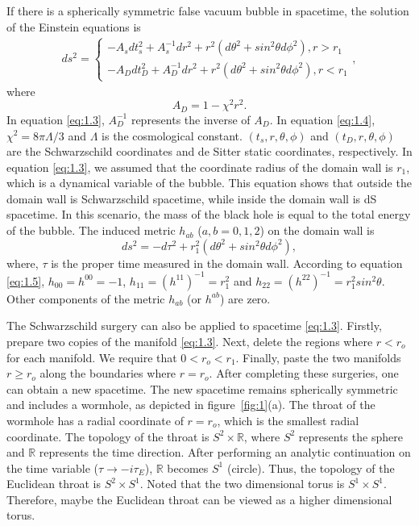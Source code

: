 \documentclass[12pt]{article}
\begin{document}
If there is a spherically symmetric false vacuum bubble in spacetime, the solution of the Einstein equations is~\cite{SEA}
\begin{eqnarray}
\label{eq:1.3}%
  ds^{2}=\begin{cases}
      -A_{s}dt_{s}^{2}+A_{s}^{-1}dr^{2}+r^{2}(d\theta^{2}+sin^{2} \theta d\phi^{2}),r>r_{1}\\
     -A_{D}dt_{D}^{2}+A_{D}^{-1}dr^{2}+r^{2}(d\theta^{2}+sin^{2} \theta d\phi^{2}),r<r_{1}
   \end{cases},
\end{eqnarray}
where
\begin{equation}
\label{eq:1.4}%
A_{D}=1-\chi^{2}r^{2}.
\end{equation}
In equation \eqref{eq:1.3}, $A_{D}^{-1}$ represents the inverse of $A_{D}$. In equation \eqref{eq:1.4}, $\chi^{2}=8\pi\Lambda/3$ and $\Lambda$ is the cosmological constant. $(t_{s}, r, \theta, \phi)$ and $(t_{D}, r, \theta, \phi)$ are the Schwarzschild coordinates and de Sitter static coordinates, respectively. In equation \eqref{eq:1.3}, we assumed that the coordinate radius of the domain wall is $r_{1}$, which is a dynamical variable of the bubble. This equation shows that outside the domain wall is Schwarzschild spacetime, while inside the domain wall is dS spacetime. In this scenario, the mass of the black hole is equal to the total energy of the bubble. The induced metric $h_{ab}$ ($a, b=0, 1, 2$) on the domain wall is~\cite{RJ}
\begin{equation}
\label{eq:1.5}%
ds^{2}=-d\tau^{2}+r_{1}^{2}(d\theta^{2}+sin^{2} \theta d\phi^{2}),
\end{equation}
where, $\tau$ is the proper time measured in the domain wall. According to equation \eqref{eq:1.5}, $h_{00}=h^{00}=-1$, $h_{11}=(h^{11})^{-1}=r_{1}^{2}$ and $h_{22}=(h^{22})^{-1}=r_{1}^{2}sin^{2}\theta$. Other components of the metric $h_{ab}$ (or $h^{ab}$) are zero.


The Schwarzschild surgery can also be applied to spacetime \eqref{eq:1.3}. Firstly, prepare two copies of the manifold \eqref{eq:1.3}. Next, delete the regions where $r<r_{o}$ for each manifold. We require that $0<r_{o}<r_{1}$. Finally, paste the two manifolds $r\geq r_{o}$ along the boundaries where $r=r_{o}$. After completing these surgeries, one can obtain a new spacetime. The new spacetime remains spherically symmetric and includes a wormhole, as depicted in figure~\ref{fig:1}(a). The throat of the wormhole has a radial coordinate of $r=r_{o}$,  which is the smallest radial coordinate. The topology of the throat is $S^{2}\times \mathbb{R}$, where $S^{2}$ represents the sphere and $\mathbb{R}$ represents the time direction. After performing an analytic continuation on the time variable ($\tau\rightarrow - i \tau_{E}$), $\mathbb{R}$ becomes $S^{1}$ (circle). Thus, the topology of the Euclidean throat is $S^{2}\times S^{1}$. Noted that the two dimensional torus is $S^{1}\times S^{1}$. Therefore, maybe the Euclidean throat can be viewed as a higher dimensional torus.
\end{document}
